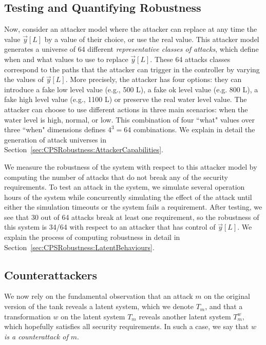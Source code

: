 \subsection*{Testing and Quantifying Robustness}
Now, consider an attacker model where the attacker can replace at any time the value $\vec{y}[L]$ by a value of their choice, or use the real value. This attacker model generates a universe of 64 different \emph{representative classes of attacks}, which define when and what values to use to replace $\vec{y}[L]$. These 64 attacks classes correspond to the paths that the attacker can trigger in the controller by varying the values of $\vec{y}[L]$.  More precisely, the attacker has four options: they can introduce a fake low level value (e.g., 500 L), a fake ok level value (e.g. 800 L), a fake high level value (e.g., 1100 L) or preserve the real water level value. The attacker can choose to use different actions in three main scenarios: when the water level is high, normal, or low. This combination of four ``what" values over three ``when" dimensions defines $4^3=64$ combinations. We explain in detail the generation of attack universes in Section~\ref{sec:CPSRobustness:AttackerCapabilities}. 

We measure the robustness of the system with respect to this attacker model by computing the number of attacks that do not break any of the security requirements. To test an attack in the system, we simulate several operation hours of the system while concurrently simulating the effect of the attack until either the simulation timeouts or the system fails a requirement. After testing, we see that 30 out of 64 attacks break at least one requirement, so the robustness of this system is 34/64 with respect to an attacker that has control of $\vec{y}[L]$. We explain the process of computing robustness in detail in Section~\ref{sec:CPSRobustness:LatentBehaviours}.

\subsection*{Counterattackers}
We now rely on the fundamental observation that an attack $m$ on the original version of the tank reveals a latent system, which we denote $T_m$, and that a transformation $w$ on the latent system $T_m$ reveals another latent system $T^w_m$, which hopefully satisfies all security requirements. In such a case, we say that \emph{$w$ is a counterattack of $m$}. 

